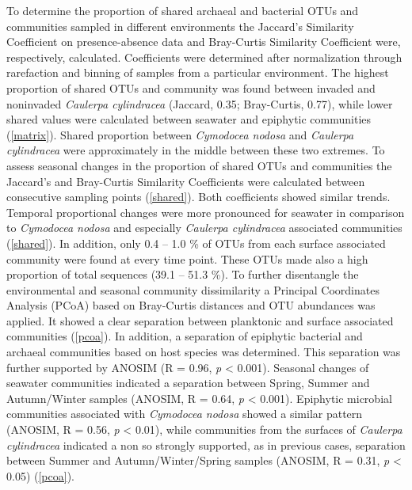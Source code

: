 \documentclass[12pt,]{article}
\begin{document}
To determine the proportion of shared archaeal and bacterial OTUs and
communities sampled in different environments the Jaccard's Similarity
Coefficient on presence-absence data and Bray-Curtis Similarity
Coefficient were, respectively, calculated. Coefficients were determined
after normalization through rarefaction and binning of samples from a
particular environment. The highest proportion of shared OTUs and
community was found between invaded and noninvaded \emph{Caulerpa
cylindracea} (Jaccard, 0.35; Bray-Curtis, 0.77), while lower shared
values were calculated between seawater and epiphytic communities
(\autoref{matrix}). Shared proportion between \emph{Cymodocea nodosa}
and \emph{Caulerpa cylindracea} were approximately in the middle between
these two extremes. To assess seasonal changes in the proportion of
shared OTUs and communities the Jaccard's and Bray-Curtis Similarity
Coefficients were calculated between consecutive sampling points
(\autoref{shared}). Both coefficients showed similar trends. Temporal
proportional changes were more pronounced for seawater in comparison to
\emph{Cymodocea nodosa} and especially \emph{Caulerpa cylindracea}
associated communities (\autoref{shared}). In addition, only 0.4 -- 1.0
\si{\percent} of OTUs from each surface associated community were found
at every time point. These OTUs made also a high proportion of total
sequences (39.1 -- 51.3 \si{\percent}). To further disentangle the
environmental and seasonal community dissimilarity a Principal
Coordinates Analysis (PCoA) based on Bray-Curtis distances and OTU
abundances was applied. It showed a clear separation between planktonic
and surface associated communities (\autoref{pcoa}). In addition, a
separation of epiphytic bacterial and archaeal communities based on host
species was determined. This separation was further supported by ANOSIM
(R = 0.96, \emph{p} \textless{} 0.001). Seasonal changes of seawater
communities indicated a separation between Spring, Summer and
Autumn/Winter samples (ANOSIM, R = 0.64, \emph{p} \textless{} 0.001).
Epiphytic microbial communities associated with \emph{Cymodocea nodosa}
showed a similar pattern (ANOSIM, R = 0.56, \emph{p} \textless{} 0.01),
while communities from the surfaces of \emph{Caulerpa cylindracea}
indicated a non so strongly supported, as in previous cases, separation
between Summer and Autumn/Winter/Spring samples (ANOSIM, R = 0.31,
\emph{p} \textless{} 0.05) (\autoref{pcoa}).
\end{document}
